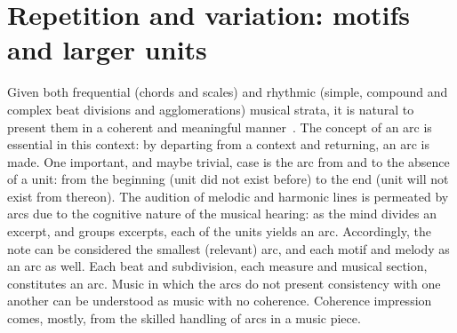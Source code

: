 \documentclass[format=acmsmall, review=false, screen=true]{acmart}
\begin{document}
\section{Repetition and variation: motifs and larger units}\label{subsec:motivos}
Given both frequential (chords and scales) and rhythmic (simple, compound and complex beat divisions and agglomerations) musical strata, it is
natural to present them in a coherent and meaningful manner~\cite{Boulez}.
The concept of an arc is essential in this context:
by departing from a context and returning, an arc is made.
One important, and maybe trivial, case is the arc from and to the absence of a unit: from the beginning (unit did not exist before) to the end (unit will not exist from thereon).
The audition of melodic and harmonic lines is permeated by
arcs due to the cognitive nature of the musical hearing: as the mind divides an excerpt, and groups excerpts, each of the units yields an arc.
Accordingly, the note can be considered the smallest (relevant) arc, and each motif and melody as an arc as well.
Each beat and subdivision, each measure and musical
section, constitutes an arc. Music in which the arcs do not present consistency with one another can be understood as music with no coherence. Coherence impression
comes, mostly, from the skilled handling of arcs in a music piece.
\end{document}
